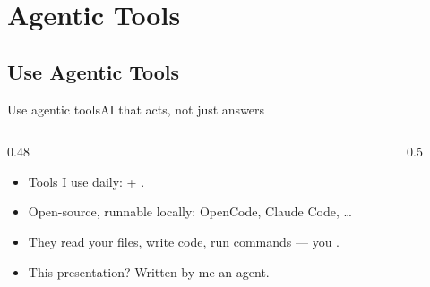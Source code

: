 
\section{Agentic Tools}
\subsection{Use Agentic Tools}

\begin{frame}{Use agentic tools}{AI that acts, not just answers}
    \begin{columns}
        \begin{column}{0.48\textwidth}
            \pause\begin{itemize}[<+->]
                \item Tools I use daily:  + .
                \item Open-source, runnable locally: OpenCode, Claude Code, \ldots
                \item They read your files, write code, run commands --- you .
                \item This presentation? Written by me  an agent.
            \end{itemize}
        \end{column}
        \begin{column}{0.5\textwidth}
            \begin{tcolorbox}[darkstyle,title={\tiny a session, roughly}]

\end{tcolorbox}
\end{column}
\end{columns}
\end{frame}
